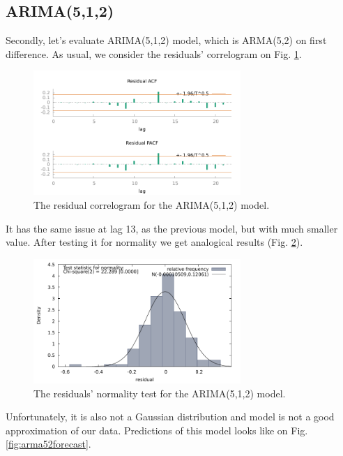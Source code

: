 \documentclass[14pt,a4paper]{extarticle}
\newcounter{e}
\numberwithin{equation}{section}
\numberwithin{figure}{section}
\begin{document}
\subsection{ARIMA(5,1,2)}
Secondly, let's evaluate ARIMA(5,1,2) model, which is ARMA(5,2) on first difference. As usual, we consider the residuals' correlogram on Fig. \ref{fig:arma_5_2_residual_corr}.

\begin{figure}[h!]
	\centering
	\includegraphics[width=0.7\textwidth]{resources/arma_5_2_residual_corr.pdf}
	\caption{The residual correlogram for the ARIMA(5,1,2) model.}
	\label{fig:arma_5_2_residual_corr}
\end{figure}

It has the same issue at lag 13, as the previous model, but with much smaller value. After testing it for normality we get analogical results (Fig. \ref{fig:residual_normality2}).

\begin{figure}[h!]
	\centering
	\includegraphics[width=0.7\textwidth]{resources/residual_normality2.pdf}
	\caption{The residuals' normality test for the ARIMA(5,1,2) model.}
	\label{fig:residual_normality2}
\end{figure}

Unfortunately, it is also not a Gaussian distribution and model is not a good approximation of our data. Predictions of this model looks like on Fig. \ref{fig:arma52forecast}.
\end{document}
